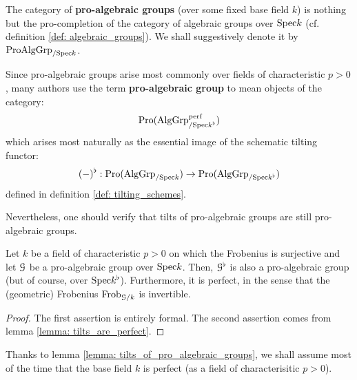                 \begin{definition} \label{def: pro_algebraic_groups}
                    The category of \textbf{pro-algebraic groups} (over some fixed base field $k$) is nothing but the pro-completion of the category of algebraic groups over $\mathrm{Spec} k$ (cf. definition \ref{def: algebraic_groups}). We shall suggestively denote it by $\mathrm{Pro}\mathrm{Alg}\mathrm{Grp}_{/\mathrm{Spec} k}$.
                \end{definition}
                \begin{remark}
                    Since pro-algebraic groups arise most commonly over fields of characteristic $p > 0$, many authors use the term \textbf{pro-algebraic group} to mean objects of the category:
                        $$\mathrm{Pro}(\mathrm{Alg}\mathrm{Grp}_{/\mathrm{Spec} k^{\flat}}^{\mathrm{perf}})$$
                    which arises most naturally as the essential image of the schematic tilting functor:
                        $$(-)^{\flat}: \mathrm{Pro}(\mathrm{Alg}\mathrm{Grp}_{/\mathrm{Spec} k}) \to \mathrm{Pro}(\mathrm{Alg}\mathrm{Grp}_{/\mathrm{Spec} k^{\flat}})$$
                    defined in definition \ref{def: tilting_schemes}. 
                \end{remark}
                
                Nevertheless, one should verify that tilts of pro-algebraic groups are still pro-algebraic groups.
                \begin{lemma} \label{lemma: tilts_of_pro_algebraic_groups}
                    Let $k$ be a field of characteristic $p > 0$ on which the Frobenius is surjective and let $\mathcal{G}$ be a pro-algebraic group over $\mathrm{Spec} k$. Then, $\mathcal{G}^{\flat}$ is also a pro-algebraic group (but of course, over $\mathrm{Spec} k^{\flat}$). Furthermore, it is perfect, in the sense that the (geometric) Frobenius $\mathrm{Frob}_{\mathcal{G}/k}$ is invertible.
                \end{lemma}
                    \begin{proof}
                        The first assertion is entirely formal. The second assertion comes from lemma \ref{lemma: tilts_are_perfect}.
                    \end{proof}
                \begin{remark}
                    Thanks to lemma \ref{lemma: tilts_of_pro_algebraic_groups}, we shall assume most of the time that the base field $k$ is perfect (as a field of characterisitic $p > 0$).
                \end{remark}
                
